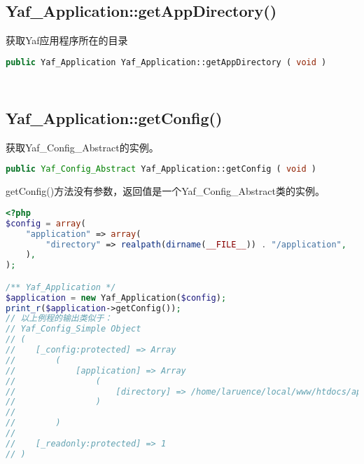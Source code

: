 \begin{lstlisting}[language=PHP]

\end{lstlisting}


\subsection{Yaf\_Application::getAppDirectory()}

获取Yaf应用程序所在的目录






\begin{lstlisting}[language=PHP]
public Yaf_Application Yaf_Application::getAppDirectory ( void )
\end{lstlisting}



\begin{lstlisting}[language=PHP]

\end{lstlisting}



\begin{lstlisting}[language=PHP]

\end{lstlisting}


\subsection{Yaf\_Application::getConfig()}

获取Yaf\_Config\_Abstract的实例。






\begin{lstlisting}[language=PHP]
public Yaf_Config_Abstract Yaf_Application::getConfig ( void )
\end{lstlisting}

getConfig()方法没有参数，返回值是一个Yaf\_Config\_Abstract类的实例。

\begin{lstlisting}[language=PHP]
<?php
$config = array(
    "application" => array(
        "directory" => realpath(dirname(__FILE__)) . "/application",
    ),
);

/** Yaf_Application */
$application = new Yaf_Application($config);
print_r($application->getConfig());
// 以上例程的输出类似于：
// Yaf_Config_Simple Object
// (
//    [_config:protected] => Array
//        (
//            [application] => Array
//                (
//                    [directory] => /home/laruence/local/www/htdocs/application
//                )
//
//        )
//
//    [_readonly:protected] => 1
// )
\end{lstlisting}






